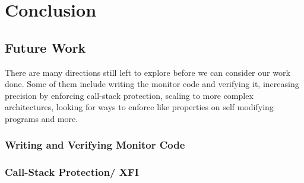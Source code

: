\chapter{Conclusion}

\section{Future Work}

There are many directions still left to explore before we can consider
our work done. Some of them include writing the \CFI monitor code and
verifying it, increasing precision by enforcing call-stack protection,
scaling to more complex architectures, looking for ways to enforce
\CFI like properties on self modifying programs and more.

\subsection{Writing and Verifying Monitor Code}


\subsection{Call-Stack Protection/ XFI}
